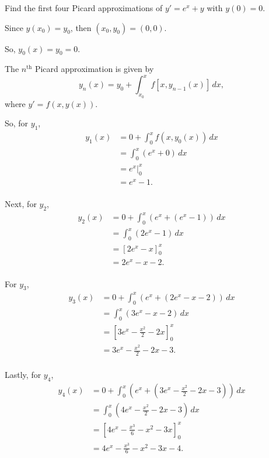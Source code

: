 \documentclass[../hw5]{subfiles}
\begin{document}
Find the first four Picard approximations of $y'=e^x+y$ with $y(0)=0$.

Since $y(x_0)=y_0$, then $(x_0,y_0)=(0,0)$.

So, $y_0(x)=y_0=0$.

The $n^{\text{th}}$ Picard approximation is given by
\[y_n(x)=y_0+\int_{x_0}^{x}f[x,y_{n-1}(x)]\,dx,\]
where $y'=f(x,y(x))$.

So, for $y_1$,
\begin{align*}
   y_1(x)&=0+\int_{0}^{x} f(x,y_0(x))\,dx \\
   &=\int_{0}^{x}(e^x+0)\,dx\\
   &=e^x\big\vert_{0}^{x} \\
   &=e^x-1. \\
\end{align*}

Next, for $y_2$,
\begin{align*}
    y_2(x)&=0+\int_{0}^{x}\left( e^x+(e^x-1) \right)\,dx \\
    &= \int_{0}^{x}(2e^x-1)\,dx \\
    &= {\left[ 2e^x-x \right]}_{0}^{x} \\
    &= 2e^x-x-2. \\
\end{align*}

For $y_3$,
\begin{align*}
    y_3(x)&=0+\int_{0}^{x}\left( e^x +(2e^x-x-2)\right)\,dx \\
    &= \int_{0}^{x}(3e^x-x-2)\,dx \\
    &= {\left[ 3e^x-\frac{x^2}{2}-2x \right]}_{0}^{x} \\
    &=3e^x-\frac{x^2}{2}-2x-3. \\
\end{align*}

Lastly, for $y_4$,
\begin{align*}
    y_4(x)&= 0+\int_{0}^{x}\left( e^x+\left( 3e^x-\frac{x^2}{2}-2x-3 \right) \right)\,dx \\
    &= \int_{0}^{x}\left( 4e^x-\frac{x^2}{2}-2x-3 \right)\,dx \\
    &= {\left[ 4e^x-\frac{x^3}{6}-x^2-3x \right]}_{0}^{x} \\
    &= 4e^x-\frac{x^3}{6}-x^2-3x-4. \\
\end{align*}
\end{document}
